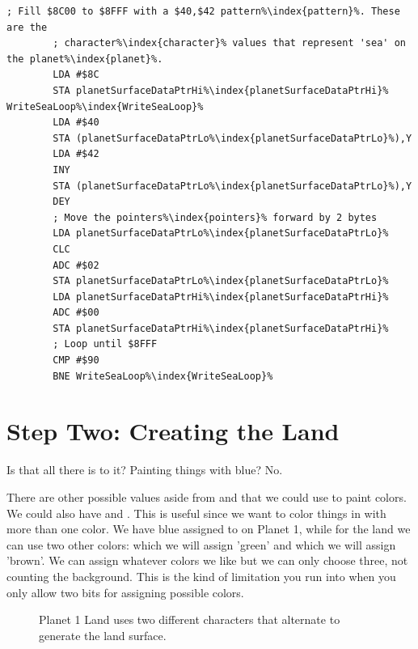 \begin{lstlisting}[escapechar=\%,caption=Filling the entire bottom surface\index{surface} of the planet\index{planet} with \icode{\$40,\$42}\, which gives us the sea. Our next step is
to overwrite some of this with land.]
        ; Fill $8C00 to $8FFF with a $40,$42 pattern%\index{pattern}%. These are the
        ; character%\index{character}% values that represent 'sea' on the planet%\index{planet}%.
        LDA #$8C
        STA planetSurfaceDataPtrHi%\index{planetSurfaceDataPtrHi}%
WriteSeaLoop%\index{WriteSeaLoop}%   
        LDA #$40
        STA (planetSurfaceDataPtrLo%\index{planetSurfaceDataPtrLo}%),Y
        LDA #$42
        INY
        STA (planetSurfaceDataPtrLo%\index{planetSurfaceDataPtrLo}%),Y
        DEY
        ; Move the pointers%\index{pointers}% forward by 2 bytes
        LDA planetSurfaceDataPtrLo%\index{planetSurfaceDataPtrLo}%
        CLC
        ADC #$02
        STA planetSurfaceDataPtrLo%\index{planetSurfaceDataPtrLo}%
        LDA planetSurfaceDataPtrHi%\index{planetSurfaceDataPtrHi}%
        ADC #$00
        STA planetSurfaceDataPtrHi%\index{planetSurfaceDataPtrHi}%
        ; Loop until $8FFF
        CMP #$90
        BNE WriteSeaLoop%\index{WriteSeaLoop}%
\end{lstlisting}



\section{Step Two: Creating the Land}

Is that all there is to it? Painting things with blue? No. 

There are other possible values aside from  and  that we
could use to paint colors. We could also have  and . This
is useful since we want to color things in with more than one color. We have
blue assigned to  on Planet 1, while for the land we can use two
other colors:  which we will assign 'green' and  which we
will assign 'brown'. We can assign whatever colors we like but we can only
choose three, not counting the background. This is the kind of limitation you
run into when you only allow two bits for assigning possible colors.

\begin{figure}[H]
{
  \setlength{\tabcolsep}{3.0pt}
  \setlength\cmidrulewidth{\heavyrulewidth} %
    \begin{adjustbox}{width=10cm,center}
  \begin{subfigure}{0.3\textwidth}
  
  \end{subfigure}
  \begin{subfigure}{0.3\textwidth}
  
  \end{subfigure}
  \end{adjustbox}
}\caption[]{Planet 1 Land uses two different characters that alternate to generate the land surface.}
\end{figure}


